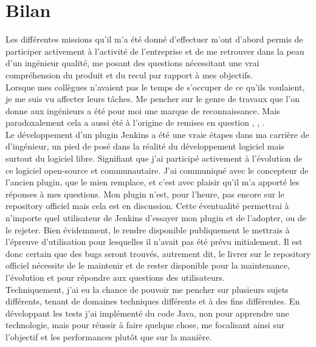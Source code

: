 \chapter*{Bilan}

Les diff\'{e}rentes missions qu'il m'a \'{e}t\'{e} donn\'{e} d'effectuer m'ont d'abord permis de participer activement \`{a} l'activit\'{e} de l'entreprise et de me retrouver dans la peau d'un ing\'{e}nieur qualit\'{e}, me posant des questions n\'{e}cessitant une vrai compr\'{e}hension du produit et du recul par rapport \`{a} mes objectifs.\\

Lorsque mes coll\`{e}gues n'avaient pas le temps de s'occuper de ce qu'ils voulaient, je me suis vu affecter leurs t\^{a}ches. Me pencher sur le genre de travaux que l'on donne aux ing\'{e}nieurs a \'{e}t\'{e} pour moi une marque de reconnaissance. Mais paradoxalement cela a aussi \'{e}t\'{e} \`{a} l'origine de remises en question , , .\\

Le d\'{e}veloppement d'un plugin Jenkins a \'{e}t\'{e} une vraie \'{e}tapes dans ma carri\`{e}re de d'ing\'{e}nieur, un pied de pos\'{e} dans la r\'{e}alit\'{e} du d\'{e}veloppement logiciel mais surtout du logiciel libre. Signifiant que j'ai particip\'{e} activement \`{a} l'\'{e}volution de ce logiciel open-source et communautaire. J'ai communiqu\'{e} avec le concepteur de l'ancien plugin, que le mien remplace, et c'est avec plaisir qu'il m'a apport\'{e} les r\'{e}ponses \`{a} mes questions. Mon plugin n'est, pour l'heure, pas encore sur le repository officiel mais cela est en discussion. Cette \'{e}ventualit\'{e} permettrai \`{a} n'importe quel utilisateur de Jenkins d'essayer mon plugin et de l'adopter, ou de le rejeter. Bien \'{e}videmment, le rendre disponible publiquement le mettrais \`{a} l'\'{e}preuve d'utilisation pour lesquelles il n'avait pas \'{e}t\'{e} pr\'{e}vu initialement. Il est donc certain que des bugs seront trouv\'{e}s, autrement dit, le livrer sur le repository officiel n\'{e}cessite de le maintenir et de rester disponible pour la maintenance, l'\'{e}volution et pour r\'{e}pondre aux questions des utilisateurs.\\

Techniquement, j'ai eu la chance de pouvoir me pencher sur plusieurs sujets diff\'{e}rents, tenant de domaines techniques diff\'{e}rents et \`{a} des fins diff\'{e}rentes. En d\'{e}veloppant les tests j'ai impl\'{e}ment\'{e} du code Java, non pour apprendre une technologie, mais pour r\'{e}ussir \`{a} faire quelque chose, me focalisant ainsi sur l'objectif et les performances plut\^{o}t que sur la mani\`{e}re.\\

